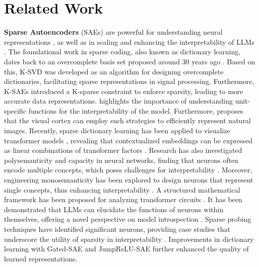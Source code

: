 \section{Related Work}

\textbf{Sparse Autoencoders} (SAEs) are powerful for understanding neural representations \citep{gao2024scaling, paulo2024automatically, braun2024identifying}, as well as in scaling and enhancing the interpretability of LLMs \citep{cunningham2023sparse, foote2023neuron}.
The foundational work in sparse coding, also known as dictionary learning, dates back to an overcomplete basis set proposed around 30 years ago \citep{olshausen1997sparse}. Based on this, K-SVD \citep{aharon2006k} was developed as an algorithm for designing overcomplete dictionaries, facilitating sparse representations in signal processing. Furthermore, K-SAEs \citep{makhzani2013k} introduced a K-sparse constraint to enforce sparsity, leading to more accurate data representations.
\cite{bau2020understanding} highlights the importance of understanding unit-specific functions for the interpretability of the model. Furthermore, \cite{tonolini2020variational} proposes that the visual cortex can employ such strategies to efficiently represent natural images.
Recently, sparse dictionary learning has been applied to visualize transformer models \citep{elhage2022toy, henighan2023superposition}, revealing that contextualized embeddings can be expressed as linear combinations of transformer factors \citep{yun2021transformer}. Research has also investigated polysemanticity and capacity in neural networks, finding that neurons often encode multiple concepts, which poses challenges for interpretability \citep{scherlis2022polysemanticity, lieberum2024gemma}. Moreover, engineering monosemanticity has been explored to design neurons that represent single concepts, thus enhancing interpretability \citep{jermyn2022engineering}.
A structured mathematical framework has been proposed for analyzing transformer circuits \citep{elhage2021mathematical}. It has been demonstrated that LLMs can elucidate the functions of neurons within themselves, offering a novel perspective on model introspection \citep{bills2023language}.
Sparse probing techniques have identified significant neurons, providing case studies that underscore the utility of sparsity in interpretability \citep{gurneefinding}. Improvements in dictionary learning with Gated-SAE \citep{rajamanoharan2024improving} and JumpReLU-SAE \citep{rajamanoharan2024jumping} further enhanced the quality of learned representations.

